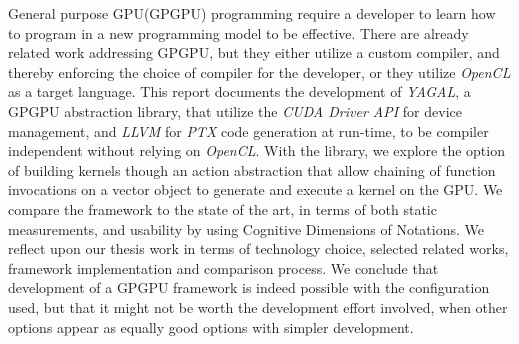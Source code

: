General purpose GPU(GPGPU) programming require a developer to learn how to program in a new programming model to be effective. There are already related work addressing GPGPU, but they either utilize a custom compiler, and thereby enforcing the choice of compiler for the developer, or they utilize \textit{OpenCL} as a target language.
This report documents the development of \textit{YAGAL}, a GPGPU abstraction library, that utilize the \textit{CUDA Driver API} for device management, and \textit{LLVM} for \textit{PTX} code generation at run-time, to be compiler independent without relying on \textit{OpenCL}.
With the library, we explore the option of building kernels though an action abstraction that allow chaining of function invocations on a vector object to generate and execute a kernel on the GPU.
We compare the framework to the state of the art, in terms of both static measurements, and usability by using Cognitive Dimensions of Notations.
We reflect upon our thesis work in terms of technology choice, selected related works, framework implementation and comparison process.
We conclude that development of a GPGPU framework is indeed possible with the configuration used, but that it might not be worth the development effort involved, when other options appear as equally good options with simpler development.